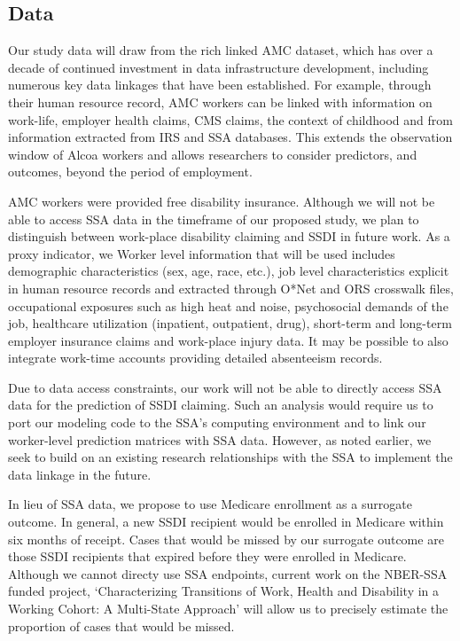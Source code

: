 \documentclass[letter]{article}
\begin{document}
\subsection{Data}
Our study data will draw from the rich linked AMC dataset, which has over a decade of continued investment in data infrastructure development, including numerous key data linkages that have been established.  For example, through their human resource record, AMC workers can be linked with information on work-life, employer health claims, CMS claims, the context of childhood and from information extracted from IRS and SSA databases.  This extends the observation window of Alcoa workers and allows researchers to consider predictors, and outcomes, beyond the period of employment.

AMC workers were provided free disability insurance.  Although we will not be able to access SSA data in the timeframe of our proposed study, we plan to distinguish between work-place disability claiming and SSDI in future work.  As a proxy indicator, we  Worker level information that will be used includes demographic characteristics (sex, age, race, etc.), job level characteristics explicit in human resource records and extracted through O*Net and ORS crosswalk files\cite{onet,orsDOL}, occupational exposures such as high heat and noise, psychosocial demands of the job, healthcare utilization (inpatient, outpatient, drug), short-term and long-term employer insurance claims and work-place injury data.  It may be possible to also integrate work-time accounts providing detailed absenteeism records.  

Due to data access constraints, our work will not be able to directly access SSA data for the prediction of SSDI claiming.  Such an analysis would require us to port our modeling code to the SSA's computing environment and to link our worker-level prediction matrices with SSA data.  However, as noted earlier, we seek to build on an existing research relationships with the SSA to implement the data linkage in the future. 

In lieu of SSA data, we propose to use Medicare enrollment as a surrogate outcome.  In general, a new SSDI recipient would be enrolled in Medicare within six months of receipt. Cases that would be missed by our surrogate outcome are those SSDI recipients that expired before they were enrolled in Medicare. Although we cannot directy use SSA endpoints, current work on the NBER-SSA funded project, `Characterizing Transitions of Work, Health and Disability in a Working Cohort: A Multi-State Approach' will allow us to precisely estimate the proportion of cases that would be missed.
\end{document}
